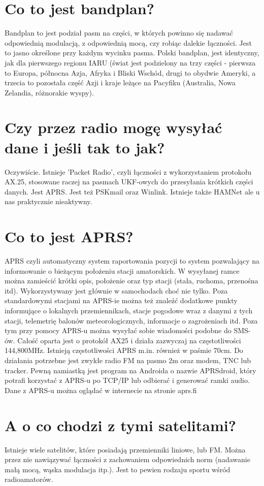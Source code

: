 \documentclass[a4paper,12pt]{article}
\begin{document}
\section{Co to jest bandplan?}
Bandplan to jest podział pasm na części, w których powinno się nadawać odpowiednią modulacją, z odpowiednią mocą, czy robiąc dalekie łączności. Jest to jasno określone przy każdym wycinku pasma. 
Polski bandplan, jest identyczny, jak dla pierwszego regionu IARU (świat jest podzielony na trzy części - pierwsza to Europa, północna Azja, Afryka i Bliski Wschód, drugi to obydwie Ameryki, a trzecia to pozostała część Azji i kraje leżące na Pacyfiku (Australia, Nowa Zelandia, różnorakie wyspy).

\section{Czy przez radio mogę wysyłać dane i jeśli tak to jak?}
Oczywiście. Istnieje 'Packet Radio', czyli łączności z wykorzystaniem protokołu AX.25, stosowane raczej na pasmach UKF-owych do przesyłania krótkich części danych.
Jest APRS.
Jest też PSKmail oraz Winlink.
Istnieje także HAMNet ale u nas praktycznie nieaktywny.

\section{Co to jest APRS?}
APRS czyli automatyczny system raportowania pozycji to system pozwalający na informowanie o bieżącym położeniu stacji amatorskich. W wysyłanej ramce można zamieścić krótki opis, położenie oraz typ stacji (stała, ruchoma, przenośna itd). Wykorzystywany jest głównie w samochodach choć nie tylko. Poza standardowymi stacjami na APRS-ie można też znaleźć dodatkowe punkty informujące o lokalnych przemiennikach, stacje pogodowe wraz z danymi z tych stacji, telemetrię balonów meteorologicznych, informacje o zagrożeniach itd. 
Poza tym przy pomocy APRS-u można wysyłać sobie wiadomości podobne do SMS-ów.
Całość oparta jest o protokół AX25 i działa zazwyczaj na częstotliwości 144,800MHz. Istnieją częstotliwości APRS m.in. również w paśmie 70cm.
Do działania potrzebne jest zwykłe radio FM na pasmo 2m oraz modem, TNC lub tracker. 
Pewną namiastką jest program na Androida o nazwie APRSdroid, który potrafi korzystać z APRS-u po TCP/IP lub odbierać i generować ramki audio.
Dane z APRS-u można oglądać w internecie na stronie aprs.fi

\section{A o co chodzi z tymi satelitami?}
Istnieje wiele satelitów, które posiadają przemienniki liniowe, lub FM. Można przez nie nawiązywać łączności z zachowaniem odpowiednich norm (nadawanie małą mocą, wąska modulacja itp.). Jest to pewien rodzaju sportu wśród radioamatorów.
\end{document}

